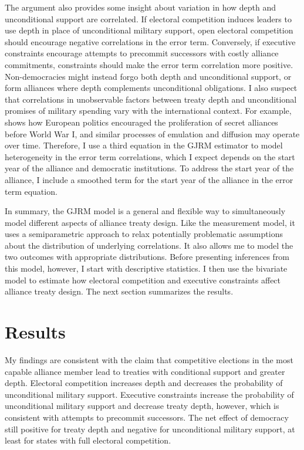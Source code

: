\documentclass[12pt]{article}
\begin{document}
The argument also provides some insight about variation in how depth and unconditional support are correlated.  
If electoral competition induces leaders to use depth in place of unconditional military support, open electoral competition should encourage negative correlations in the error term. 
Conversely, if executive constraints encourage attempts to precommit successors with costly alliance commitments, constraints should make the error term correlation more positive.
Non-democracies might instead forgo both depth and unconditional support, or form alliances where depth complements unconditional obligations. 
I also suspect that correlations in unobservable factors between treaty depth and unconditional promises of military spending vary with the international context.
For example, \citet{Kuo2019} shows how European politics encouraged the proliferation of secret alliances before World War I, and similar processes of emulation and diffusion may operate over time.
Therefore, I use a third equation in the GJRM estimator to model heterogeneity in the error term correlations, which I expect depends on the start year of the alliance and democratic institutions.
To address the start year of the alliance, I include a smoothed term for the start year of the alliance in the error term equation.  


In summary, the GJRM model is a general and flexible way to simultaneously model different aspects of alliance treaty design.
Like the measurement model, it uses a semiparametric approach to relax potentially problematic assumptions about the distribution of underlying correlations. 
It also allows me to model the two outcomes with appropriate distributions. 
Before presenting inferences from this model, however, I start with descriptive statistics. 
I then use the bivariate model to estimate how electoral competition and executive constraints affect alliance treaty design. 
The next section summarizes the results. 


\section{Results}


My findings are consistent with the claim that competitive elections in the most capable alliance member lead to treaties with conditional support and greater depth. 
Electoral competition increases depth and decreases the probability of unconditional military support.
Executive constraints increase the probability of unconditional military support and decrease treaty depth, however, which is consistent with attempts to precommit successors.
The net effect of democracy still positive for treaty depth and negative for unconditional military support, at least for states with full electoral competition.   
\end{document}
